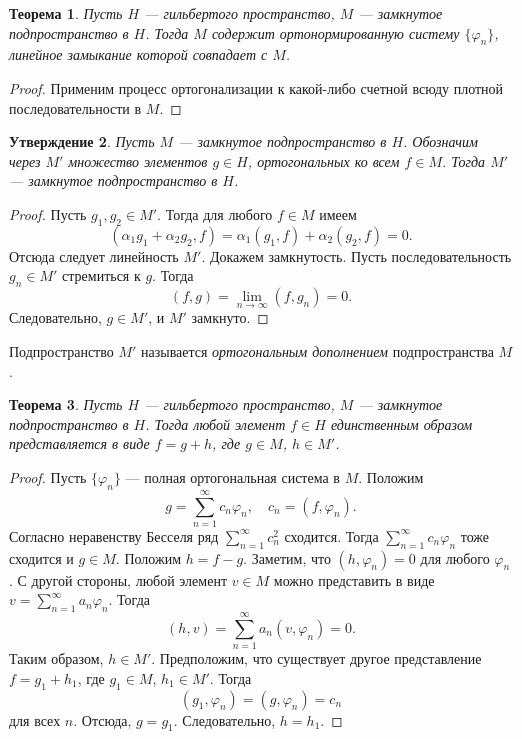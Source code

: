 \documentclass[12pt, titlepage, oneside]{amsbook}
\newtheorem{theorem}{Теорема}[chapter]
\newtheorem{claim}[theorem]{Утверждение}
\theoremstyle{definition}
\theoremstyle{remark}
\begin{document}
\begin{theorem}
\label{Hil1}
Пусть $H$ --- гильбертого пространство, $M$ --- замкнутое подпространство в $H$. Тогда $M$ содержит ортонормированную систему $\{\varphi_n\}$, линейное замыкание которой  совпадает с $M$.
\end{theorem}

\begin{proof}
Применим процесс ортогонализации к какой-либо счетной всюду плотной последовательности в $M$.
\end{proof}

\begin{claim}
\label{Hil2}
Пусть $M$ --- замкнутое подпространство в $H$. Обозначим через $M'$ множество элементов $g\in H$, ортогональных ко всем $f\in M$. Тогда $M'$ --- замкнутое подпространство в $H$.
\end{claim}

\begin{proof}
Пусть $g_1,g_2\in M'$. Тогда для любого $f\in M$ имеем $$(\alpha_1g_1+\alpha_2g_2,f)=\alpha_1(g_1,f)+\alpha_2(g_2,f)=0.$$ Отсюда следует линейность $M'$. Докажем замкнутость. Пусть последовательность $g_n\in M'$ стремиться к $g$. Тогда $$(f,g)=\lim\limits_{n\rightarrow\infty}(f,g_n)=0.$$ Следовательно, $g\in M'$, и $M'$ замкнуто.
\end{proof}

Подпространство $M'$ называется \emph{ортогональным дополнением} подпространства $M$.

\begin{theorem}
\label{Hil3}
Пусть $H$ --- гильбертого пространство, $M$ --- замкнутое подпространство в $H$. Тогда любой элемент $f\in H$ единственным образом представляется в виде $f=g+h$, где $g\in M$, $h\in M'$.
\end{theorem}

\begin{proof}
Пусть $\{\varphi_n\}$ --- полная ортогональная система в $M$. Положим $$g=\sum\limits_{n=1}^{\infty} c_n\varphi_n,\quad c_n=(f,\varphi_n).$$ Согласно неравенству Бесселя ряд $\sum\limits_{n=1}^{\infty} c^2_n$ сходится. Тогда $\sum\limits_{n=1}^{\infty} c_n\varphi_n$ тоже сходится и $g\in M$. Положим $h=f-g$. Заметим, что $(h,\varphi_n)=0$ для любого $\varphi_n$. С другой стороны, любой элемент $v\in M$ можно представить в виде $v=\sum\limits_{n=1}^{\infty} a_n\varphi_n$. Тогда $$(h,v)=\sum\limits_{n=1}^{\infty} a_n(v,\varphi_n)=0.$$ Таким образом, $h\in M'$. Предположим, что существует другое представление $f=g_1+h_1$, где $g_1\in M$, $h_1\in M'$. Тогда $$(g_1,\varphi_n)=(g,\varphi_n)=c_n$$ для всех $n$. Отсюда, $g=g_1$. Следовательно, $h=h_1$.
\end{proof}
\end{document}
